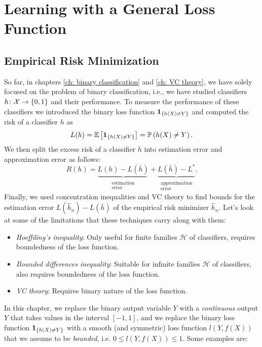 \part{Learning with a General Loss Function}

\chapter{Empirical Risk Minimization}

So far, in chapters \ref{ch: binary classification} and \ref{ch: VC theory}, we have solely focused on the problem of binary classification, i.e., we have studied classifiers $h \colon \mathcal{X} \to \left\{0, 1\right\}$ and their performance. To measure the performance of these classifiers we introduced the binary loss function $\mathbf{1}_{\left\{h(X) \neq Y\right\}}$ and computed the risk of a classifier $h$ as
\[
    L(h) = \mathbb{E}\left[\mathbf{1}_{\left\{h(X) \neq Y\right\}}\right] = \mathbb{P}\left(h(X) \neq Y\right).
\]
We then split the excess risk of a classifier $h$ into estimation error and approximation error as follows:
\[
    R(h) = \underbrace{L(h) - L(\bar h)}_{\substack{\text{estimation} \\ \text{error}}} + \underbrace{L(\bar h) - L^*}_{\substack{\text{approximation} \\ \text{error}}}.
\]
Finally, we used concentration inequalities and VC theory to find bounds for the estimation error $L(\hat h_n) - L(\bar h)$ of the empirical risk minimizer $\hat h_n$. Let's look at some of the limitations that these techniques carry along with them:

\begin{itemize}
    \item \emph{Hoeffding's inequality}: Only useful for finite families $\mathcal{H}$ of classifiers, requires boundedness of the loss function.

    \item \emph{Bounded differences inequality}: Suitable for infinite families $\mathcal{H}$ of classifiers, also requires boundedness of the loss function.

    \item \emph{VC theory}: Requires binary nature of the loss function.
\end{itemize}

In this chapter, we replace the binary output variable $Y$ with a \emph{continuous} output $Y$ that takes values in the interval $[-1, 1]$, and we replace the binary loss function $\mathbf{1}_{\left\{h(X) \neq Y\right\}}$ with a smooth (and symmetric) loss function $l(Y, f(X))$ that we assume to be \emph{bounded}, i.e. $0 \leq l(Y, f(X)) \leq 1$. Some examples are:

